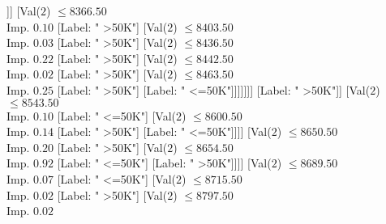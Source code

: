 \documentclass[margin=10pt]{standalone}
\begin{document}
\begin{forest}
																																										[Label: " >50K"]
																																										[Val($2$) $ \leq 8283.50$ \\ Imp. $0.20$
																																											[Label: " <=50K"]
																																											[Label: " >50K"]]]
																																									[Val($2$) $ \leq 8366.50$ \\ Imp. $0.10$
																																										[Label: " >50K"]
																																										[Val($2$) $ \leq 8403.50$ \\ Imp. $0.03$
																																											[Label: " >50K"]
																																											[Val($2$) $ \leq 8436.50$ \\ Imp. $0.22$
																																												[Label: " >50K"]
																																												[Val($2$) $ \leq 8442.50$ \\ Imp. $0.02$
																																													[Label: " >50K"]
																																													[Val($2$) $ \leq 8463.50$ \\ Imp. $0.25$
																																														[Label: " >50K"]
																																														[Label: " <=50K"]]]]]]]
																																								[Label: " >50K"]]
																																							[Val($2$) $ \leq 8543.50$ \\ Imp. $0.10$
																																								[Label: " <=50K"]
																																								[Val($2$) $ \leq 8600.50$ \\ Imp. $0.14$
																																									[Label: " >50K"]
																																									[Label: " <=50K"]]]]
																																						[Val($2$) $ \leq 8650.50$ \\ Imp. $0.20$
																																							[Label: " >50K"]
																																							[Val($2$) $ \leq 8654.50$ \\ Imp. $0.92$
																																								[Label: " <=50K"]
																																								[Label: " >50K"]]]]
																																					[Val($2$) $ \leq 8689.50$ \\ Imp. $0.07$
																																						[Label: " <=50K"]
																																						[Val($2$) $ \leq 8715.50$ \\ Imp. $0.02$
																																							[Label: " >50K"]
																																							[Val($2$) $ \leq 8797.50$ \\ Imp. $0.02$

\end{forest}
\end{document}
